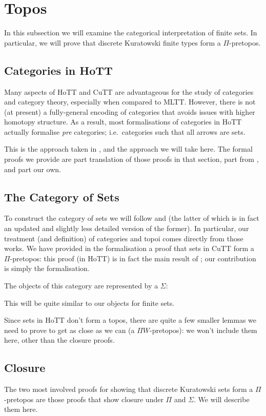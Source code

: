 \section{Topos}\label{topos}
In this subsection we will examine the categorical interpretation of finite
sets.
In particular, we will prove that discrete Kuratowski finite types form a
\(\Pi\)-pretopos.

\subsection{Categories in HoTT}
Many aspects of HoTT and CuTT are advantageous for the study of categories and
category theory, especially when compared to MLTT.
However, there is not (at present) a fully-general encoding of categories
that avoids issues with higher homotopy structure.
As a result, most formalisations of categories in HoTT actually formalise
\emph{pre} categories; i.e.\ categories such that all arrows are sets.

This is the approach taken in \cite[section 9]{hottbook}, and the approach we
will take here.
The formal proofs we provide are part translation of those proofs in that
section, part from \cite{iversenFredefoxCat2018}
\cite{huProofrelevantCategoryTheory2020}, and part our own.

\subsection{The Category of Sets}
To construct the category of sets we will follow
\cite{rijkeSetsHomotopyType2015} and
\cite[section 10]{hottbook} (the latter of which is in fact an updated and
slightly less detailed version of the former).
In particular, our treatment (and definition) of categories and topoi comes
directly from those works.
We have provided in the formalisation a proof that sets in CuTT form a
\(\Pi\)-pretopos: this proof (in HoTT) is in fact the main result of
\cite{rijkeSetsHomotopyType2015}; our contribution is simply the formalisation.

The objects of this category are represented by a \(\Sigma\):

This will be quite similar to our objects for finite sets.

Since sets in HoTT don't form a topos, there are quite a few smaller lemmas we
need to prove to get as close as we can (a \(\Pi W\)-pretopos): we won't include
them here, other than the closure proofs.
\subsection{Closure}
The two most involved proofs for showing that discrete Kuratowski sets form a
\(\Pi\)-pretopos are those proofs that show closure under \(\Pi\) and
\(\Sigma\).
We will describe them here.

